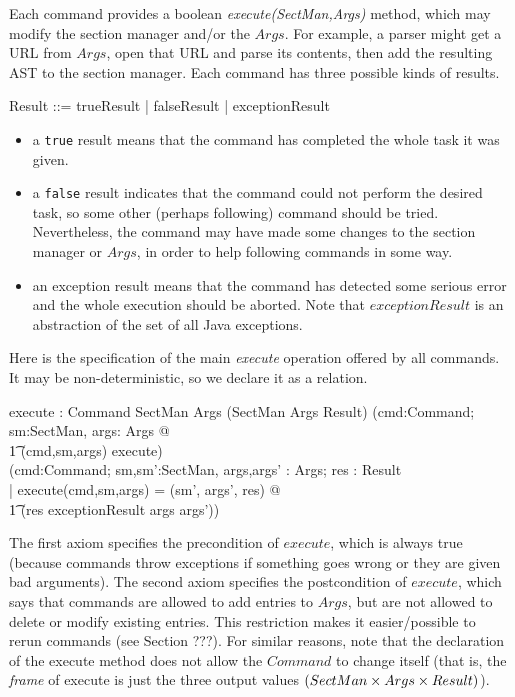 \documentclass{llncs} %
\begin{document}
Each command provides a boolean \emph{execute(SectMan,Args)} method,
which may modify the section manager and/or the $Args$.
For example, a parser might get a URL from $Args$,
open that URL and parse its contents, then add 
the resulting AST to the section manager.  Each command
has three possible kinds of results.
\begin{zed}
  Result ::= trueResult | falseResult | exceptionResult
\end{zed}
\begin{itemize}
\item a \texttt{true} result means that the command has
  completed the whole task it was given.
\item a \texttt{false} result indicates that the command
  could not perform the desired task, so some other (perhaps following)
  command should be tried.  Nevertheless, the command may have
  made some changes to the section manager or $Args$, in order
  to help following commands in some way.
\item an exception result means that the command has detected
  some serious error and the whole execution should be aborted.
  Note that $exceptionResult$ is an abstraction of the set of all Java
  exceptions.
\end{itemize}

Here is the specification of the main \emph{execute} operation
offered by all commands.  It may be non-deterministic, so we declare
it as a relation. 

\begin{axdef}
  execute : Command \cross SectMan \cross Args 
       \rel (SectMan \cross Args \cross Result)
\where
  (\forall cmd:Command; sm:SectMan, args: Args @ \\
  \t1 (cmd,sm,args) \in \dom execute) \\
  (\forall cmd:Command; sm,sm':SectMan, args,args' : Args; res : Result\\
  | execute(cmd,sm,args) = (sm', args', res) @ \\
  \t1 (res \neq exceptionResult \implies args \subseteq args'))
\end{axdef}

The first axiom specifies the precondition of $execute$, which
is always true (because commands throw exceptions if something goes
wrong or they are given bad arguments).
The second axiom specifies the postcondition of $execute$, which
says that commands are allowed to add entries to $Args$, but are not
allowed to delete or modify existing entries. 
This restriction makes it easier/possible to rerun commands (see Section
???).  For similar reasons, note that the declaration of the execute method
does not allow the $Command$ to change itself (that is, the \emph{frame}
of execute is just the three output values $(SectMan \cross Args \cross
Result)$). 
\end{document}
